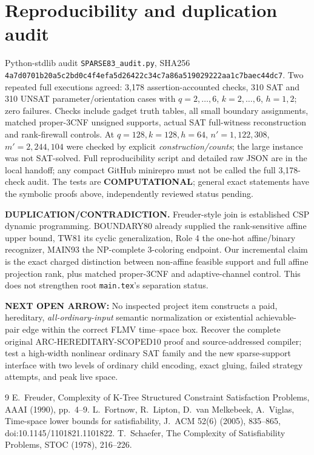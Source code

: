 \documentclass[11pt]{article}
\begin{document}
\section{Reproducibility and duplication audit}
Python-stdlib audit \texttt{SPARSE83\_audit.py}, SHA256
\texttt{4a7d0701b20a5c2bd0c4f4efa5d26422c34c7a86a519029222aa1c7baec44dc7}.
Two repeated full executions agreed: 3,178 assertion-accounted checks,
310 SAT and 310 UNSAT parameter/orientation cases with
\(q=2,\ldots,6\), \(k=2,\ldots,6\), \(h=1,2\);
zero failures. Checks include gadget truth tables, all small
boundary assignments, matched proper-3CNF unsigned supports,
actual SAT full-witness reconstruction and rank-firewall controls.
At \(q=128,k=128,h=64\), \(n'=1,122,308\),
\(m'=2,244,104\) were checked by explicit \emph{construction/counts};
the large instance was not SAT-solved. Full reproducibility script
and detailed raw JSON are in the local handoff; any compact
GitHub minirepro must not be called the full 3,178-check audit.
The tests are \textbf{COMPUTATIONAL}; general exact statements have
the symbolic proofs above, independently reviewed status pending.

\noindent\textbf{DUPLICATION/CONTRADICTION.}
Freuder-style join is established CSP dynamic programming.
BOUNDARY80 already supplied the rank-sensitive affine upper bound,
TW81 its cyclic generalization, Role 4 the one-hot affine/binary
recognizer, MAIN93 the NP-complete 3-coloring endpoint.
Our incremental claim is the exact charged distinction
between non-affine feasible support and full affine projection rank,
plus matched proper-3CNF and adaptive-channel control.
This does not strengthen root \texttt{main.tex}'s separation status.

\noindent\textbf{NEXT OPEN ARROW:} No inspected project item
constructs a paid, hereditary, \emph{all-ordinary-input} semantic
normalization or existential achievable-pair edge within the correct
FLMV time--space box. Recover the complete original
ARC-HEREDITARY-SCOPED10 proof and source-addressed compiler;
test a high-width nonlinear ordinary SAT family and the
new sparse-support interface with two levels of ordinary child
encoding, exact gluing, failed strategy attempts, and peak live space.
\begin{thebibliography}{9}\small
{} E.~Freuder, Complexity of K-Tree Structured
Constraint Satisfaction Problems, AAAI (1990), pp.~4--9.
 L.~Fortnow, R.~Lipton, D.~van Melkebeek,
A.~Viglas, Time-space lower bounds for satisfiability,
J.\ ACM 52(6) (2005), 835--865,
doi:10.1145/1101821.1101822.
 T.~Schaefer, The Complexity of Satisfiability Problems,
STOC (1978), 216--226.
\end{thebibliography}
\end{document}
